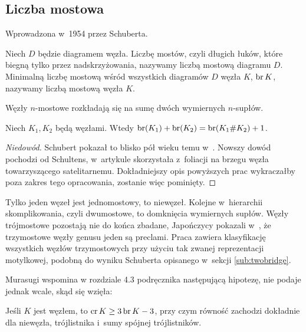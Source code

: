 \subsection{Liczba mostowa}
%

Wprowadzona w~1954 przez Schuberta.

\begin{definition}
    Niech $D$ będzie diagramem węzła.
    Liczbę mostów, czyli długich łuków, które biegną tylko przez nadskrzyżowania, nazywamy liczbą mostową diagramu $D$.
    Minimalną liczbę mostową wśród wszystkich diagramów $D$ węzła $K$, $\operatorname{br} K$, nazywamy liczbą mostową węzła $K$.
\end{definition}

Węzły $n$-mostowe rozkładają się na sumę dwóch wymiernych $n$-supłów.
%

\begin{proposition}
\label{prp:bridge_additive}%
    Niech $K_1, K_2$ będą węzłami.
    Wtedy $\operatorname{br} (K_1) + \operatorname{br}(K_2) = \operatorname{br}(K_1 \# K_2) + 1$.
\end{proposition}

\begin{proof}[Niedowód]
    Schubert pokazał to blisko pół wieku temu w~\cite{schubert54}.
    Nowszy dowód pochodzi od Schultens, w~artykule \cite{schultens03} skorzystała z~foliacji na brzegu węzła towarzyszącego satelitarnemu.
    Dokładniejszy opis powyższych prac wykraczałby poza zakres tego opracowania, zostanie więc pominięty.
\end{proof}

Tylko jeden węzeł jest jednomostowy, to niewęzeł.
Kolejne w~hierarchii skomplikowania, czyli dwumostowe, to domknięcia wymiernych supłów.
Węzły trójmostowe pozostają nie do końca zbadane, Japończycy pokazali w~\cite{fukuhama99}, że trzymostowe węzły genusu jeden są preclami.
%
%
Praca \cite{hilden12} zawiera klasyfikację wszystkich węzłów trzymostowych przy użyciu tak zwanej reprezentacji motylkowej, podobną do wyniku Schuberta opisanego w~sekcji \ref{sub:twobridge}.
%

Murasugi wspomina w rozdziale 4.3 podręcznika \cite{murasugi96} następującą hipotezę, nie podaje jednak wcale, skąd się wzięła:

\begin{conjecture}
%
    Jeśli $K$ jest węzłem, to $\operatorname{cr} K \ge 3 \operatorname{br} K - 3$, przy czym równość zachodzi dokładnie dla niewęzła, trójlistnika i~sumy spójnej trójlistników.
\end{conjecture}

